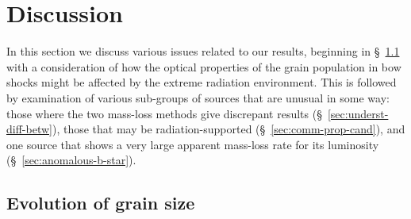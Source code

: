 





\section{Discussion}
\label{sec:discussion}

In this section we discuss various issues related to our results,
beginning in \S~\ref{sec:evolution-grain-size} with a consideration of
how the optical properties of the grain population in bow shocks might
be affected by the extreme radiation environment.  This is followed by
examination of various sub-groups of sources that are unusual in some
way: those where the two mass-loss methods give discrepant results
(\S~\ref{sec:underst-diff-betw}), those that may be
radiation-supported (\S~\ref{sec:comm-prop-cand}), and one source that
shows a very large apparent mass-loss rate for its luminosity
(\S~\ref{sec:anomalous-b-star}).

\subsection{Evolution of grain size}
\label{sec:evolution-grain-size}

